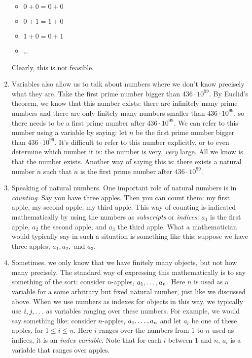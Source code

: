 \begin{enumerate}[{\thesection}.1]
		\begin{itemize}
		
			\item $0+0=0+0$
			
			\item $0+1=1+0$
			
			\item $1+0=0+1$
			
			\item \dots
			
		\end{itemize}
Clearly, this is not feasible.

  \item Variables also allow us to talk about numbers where we don't know precisely what they are.
	Take the first prime number bigger than $436\cdot 10^{99}$.
	By Euclid's theorem, we know that this number exists: there are infinitely many prime numbers and there are only finitely many numbers smaller than $436\cdot 10^{99}$, so there needs to be a first prime number after $436\cdot 10^{99}$.
	We can refer to this number using a variable by saying: let $n$ be the first prime number bigger than $436\cdot 10^{99}$.
	It's difficult to refer to this number explicitly, or to even determine which number it is: the number is very, \emph{very} large.
	All we know is that the number exists.
	Another way of saying this is: there exists a natural number $n$ such that $n$ is the first prime number after $436\cdot 10^{99}$.
	
	\item Speaking of natural numbers. One important role of natural numbers is in \emph{counting}. Say you have three apples. Then you can count them: my first apple, my second apple, my third apple. This way of counting is indicated mathematically by using the numbers as \emph{subscripts} or \emph{indices}: $a_1$ is the first apple, $a_2$ the second apple, and $a_3$ the third apple. What a mathematician would typically say in such a situation is something like this: suppose we have three apples, $a_1, a_2,$ and $a_3$. 
		
		\item Sometimes, we only know that we have finitely many objects, but not how many precisely. The standard way of expressing this mathematically is to say something of the sort: consider $n$-apples, $a_1, \mathellipsis, a_n$. Here $n$ is used as a variable for a some arbitrary but fixed natural number, just like we discussed above. When we use numbers as indexes for objects in this way, we typically use $i,j,\mathellipsis$ as variables ranging over these numbers. For example, we would say something like: consider $n$-apples, $a_1, \mathellipsis, a_n$ and let $a_i$ be one of these apples, for $1\leq i\leq n$. Here $i$ ranges over the numbers from $1$ to $n$ used as indices, it is an \emph{index variable}. Note that for each $i$ between 1 and $n$, $a_i$ is a variable that ranges over apples.
		

\end{enumerate}
